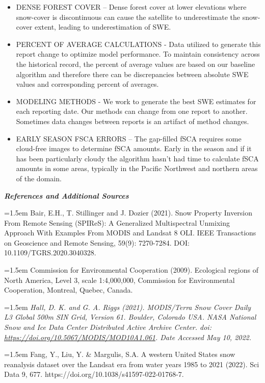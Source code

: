 \documentclass{article}
\begin{document}
\begin{itemize}
    \item DENSE FOREST COVER – Dense forest cover at lower elevations where snow-cover is discontinuous can cause the satellite to underestimate the snow-cover extent, leading to underestimation of SWE.
    \item PERCENT OF AVERAGE CALCULATIONS - Data utilized to generate this report change to optimize model performance.  To maintain consistency across the historical record, the percent of average values are based on our baseline algorithm and therefore there can be discrepancies between absolute SWE values and corresponding percent of averages.
    \item MODELING METHODS - We work to generate the best SWE estimates for each reporting date. Our methods can change from one report to another. Sometimes data changes between reports is an artifact of method changes.
    \item EARLY SEASON FSCA ERRORS – The gap-filled fSCA requires some cloud-free images to determine fSCA amounts. Early in the season and if it has been particularly cloudy the algorithm hasn’t had time to calculate fSCA amounts in some areas, typically in the Pacific Northwest and northern areas of the domain.
\end{itemize}

\newpage
\fontsize{12}{16}
\noindent\textbf{\textit{References and Additional Sources}}\\
\fontsize{10}{14}

\noindent
\hangindent=1.5em
Bair, E.H., T. Stillinger and J. Dozier (2021). Snow Property Inversion From Remote Sensing (SPIReS): A Generalized Multispectral Unmixing Approach With Examples From MODIS and Landsat 8 OLI. IEEE Transactions on Geoscience and Remote Sensing, 59(9): 7270-7284. DOI: 10.1109/TGRS.2020.3040328.

\noindent
\hangindent=1.5em
Commission for Environmental Cooperation (2009). Ecological regions of North America, Level 3, scale 1:4,000,000, Commission for Environmental Cooperation, Montreal, Quebec, Canada.

\noindent
\hangindent=1.5em
\textit{Hall, D. K. and G. A. Riggs (2021). MODIS/Terra Snow Cover Daily L3 Global 500m SIN Grid, Version 61. Boulder, Colorado USA. NASA National Snow and Ice Data Center Distributed Active Archive Center. doi: \url{https://doi.org/10.5067/MODIS/MOD10A1.061}. Date Accessed May 10, 2022.}

\noindent
\hangindent=1.5em
Fang, Y., Liu, Y. \& Margulis, S.A. A western United States snow reanalysis dataset over the Landsat era from water years 1985 to 2021 (2022). Sci Data 9, 677. https://doi.org/10.1038/s41597-022-01768-7.
\end{document}
